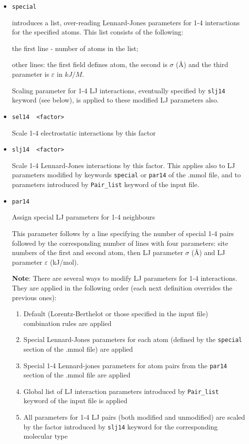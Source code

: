 \documentclass{article}
\begin{document}
\begin{itemize}
field 5) is the equilibrium angle in degrees and 6) is the force constant

\item
\verb|special| 

introduces a list, over-reading Lennard-Jones parameters for 1-4 interactions 
for the specified atoms. This list consists of the following:
 
the first line - number of atoms in the list;

other lines: the first field defines atom, the second is $\sigma$ (\AA) 
and the third parameter is $\varepsilon$ in $kJ/M$.

Scaling parameter for 1-4 LJ interactions, eventually specified by 
\verb|slj14| keyword (see below), is applied to these modified LJ parameters
also.

\item
\verb|sel14  <factor>|

Scale 1-4 electrostatic interactions by this factor

\item
\verb|slj14  <factor>|

Scale 1-4 Lennard-Jones interactions by this factor. This applies also to
LJ parameters modified by keywords \verb|special| or \verb|par14| of
the .mmol file, and to parameters introduced by \verb|Pair_list| keyword 
of the input file.

\item
\verb|par14|

Assign special LJ parameters for 1-4 neighbours

This parameter follows by a line specifying the number of special 1-4 pairs
followed by the corresponding number of lines with four parameters: 
site numbers of the first and second atom, then LJ parameter $\sigma$ (\AA) and 
LJ parameter $\varepsilon$ (kJ/mol).

{\bf Note}: There are several ways to modify LJ parameters for 1-4 
interactions. They are applied in the following order (each next definition
overrides the previous ones):

\begin{enumerate}
\item Default (Lorentz-Berthelot or those specified in the input file) 
combination rules are applied 
\item Special Lennard-Jones parameters for each atom (defined by the
\verb|special| section of the .mmol file) are applied 
\item Special 1-4 Lennard-jones parameters for atom pairs 
from the \verb|par14| section of the .mmol file are applied 
\item Global list of LJ interaction parameters introduced by \verb|Pair_list|
keyword of the input file is applied
\item All parameters for 1-4 LJ pairs (both modified and unmodified) 
are scaled by the factor introduced by \verb|slj14| keyword 
for the corresponding molecular type
\end{enumerate}


\end{itemize}
\end{document}
